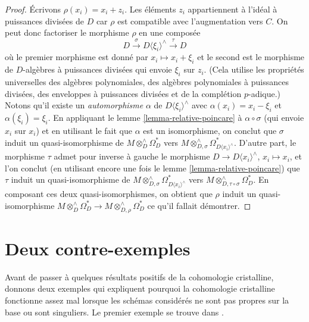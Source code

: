 \begin{proof}
\medskip\noindent
Écrivons $\rho(x_i) = x_i + z_i$. Les éléments $z_i$ appartiennent à
l'idéal à puissances divisées de $D$ car $\rho$ est compatible avec
l'augmentation vers $C$. On peut donc factoriser le morphisme $\rho$
en une composée
$$
D \xrightarrow{\sigma} D\langle \xi_i \rangle^\wedge \xrightarrow{\tau} D
$$
où le premier morphisme est donné par $x_i \mapsto x_i + \xi_i$ et le
second est le morphisme de $D$-algèbres à puissances divisées qui envoie $\xi_i$ sur $z_i$.
(Cela utilise les propriétés universelles des algèbres polynomiales, des algèbres
polynomiales à puissances divisées, des enveloppes à puissances divisées et de la complétion $p$-adique.)
Notons qu'il existe un {\it automorphisme} $\alpha$ de
$D\langle \xi_i \rangle^\wedge$ avec $\alpha(x_i) = x_i - \xi_i$
et $\alpha(\xi_i) = \xi_i$. En appliquant le lemme \ref{lemma-relative-poincare}
à $\alpha \circ \sigma$ (qui envoie $x_i$ sur $x_i$) et en utilisant le fait que
$\alpha$ est un isomorphisme, on conclut que $\sigma$ induit un
quasi-isomorphisme de $M \otimes^\wedge_D \Omega^*_D$ vers
$M \otimes^\wedge_{D, \sigma} \Omega^*_{D\langle x_i \rangle^\wedge}$.
D'autre part, le morphisme $\tau$ admet pour inverse à gauche le
morphisme $D \to D\langle x_i \rangle^\wedge$, $x_i \mapsto x_i$,
et l'on conclut (en utilisant encore une fois le lemme \ref{lemma-relative-poincare})
que $\tau$ induit un quasi-isomorphisme de
$M \otimes^\wedge_{D, \sigma} \Omega^*_{D\langle x_i \rangle^\wedge}$
vers $M \otimes^\wedge_{D, \tau \circ \sigma} \Omega^*_D$. En composant ces
deux quasi-isomorphismes, on obtient que $\rho$ induit un quasi-isomorphisme
$M \otimes^\wedge_D \Omega^*_D \to M \otimes^\wedge_{D, \rho} \Omega^*_D$
ce qu'il fallait démontrer.
\end{proof}










\section{Deux contre-exemples}
\label{section-examples}

\noindent
Avant de passer à quelques résultats positifs de la cohomologie cristalline,
donnons deux exemples qui expliquent pourquoi la cohomologie cristalline
fonctionne assez mal lorsque les schémas considérés ne sont pas
propres sur la base ou sont singuliers. Le premier exemple se trouve
dans \cite{BO}.

